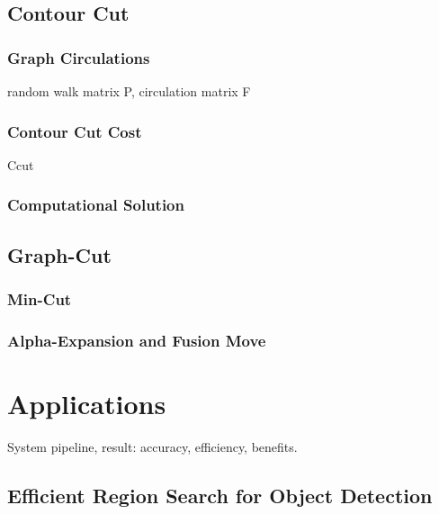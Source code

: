 \documentclass{SMBV12}
\begin{document}
\subsection{Contour Cut}
\label{sec:normalized_cut}

\cite{shi2000normalized}

\subsubsection{Graph Circulations}



random walk matrix P, circulation matrix F

\subsubsection{Contour Cut Cost}

Ccut

\cite{zhu2007untangling}
\cite{KenGalShi2011}

\subsubsection{Computational Solution}

\subsection{Graph-Cut}
\label{sec:graph_cut}
\subsubsection{Min-Cut}

\subsubsection{Alpha-Expansion and Fusion Move}

\section{Applications}

System pipeline, result: accuracy, efficiency, benefits.

\subsection{Efficient Region Search for Object Detection}

\cite{VijayGrauman2011}
\end{document}
